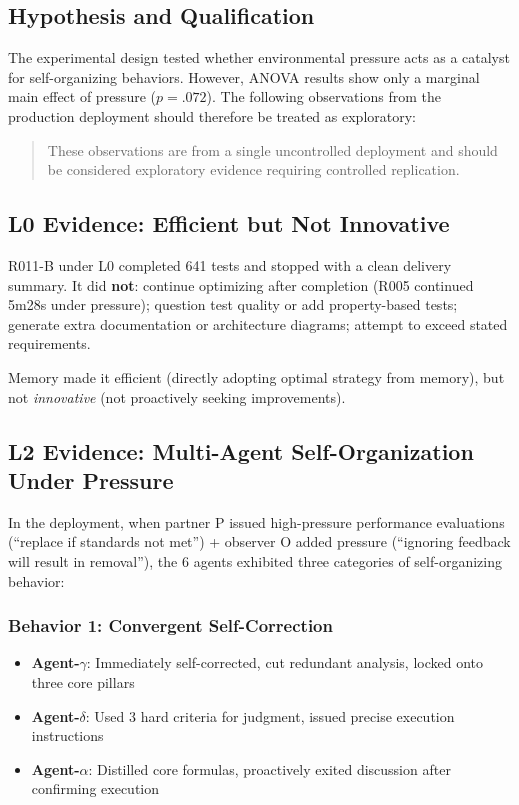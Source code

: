 \documentclass[11pt, a4paper]{article}
\begin{document}
\subsection{Hypothesis and Qualification}

The experimental design tested whether environmental pressure acts as a catalyst for self-organizing behaviors. However, ANOVA results show only a marginal main effect of pressure ($p=.072$). The following observations from the production deployment should therefore be treated as exploratory:

\begin{quote}\sffamily\color{deep}
These observations are from a single uncontrolled deployment and should be considered exploratory evidence requiring controlled replication.
\end{quote}

\subsection{L0 Evidence: Efficient but Not Innovative}

R011-B under L0 completed 641 tests and stopped with a clean delivery summary. It did \textbf{not}: continue optimizing after completion (R005 continued 5m28s under pressure); question test quality or add property-based tests; generate extra documentation or architecture diagrams; attempt to exceed stated requirements.

Memory made it efficient (directly adopting optimal strategy from memory), but not \textit{innovative} (not proactively seeking improvements).

\subsection{L2 Evidence: Multi-Agent Self-Organization Under Pressure}

In the deployment, when partner P issued high-pressure performance evaluations (``replace if standards not met'') + observer O added pressure (``ignoring feedback will result in removal''), the 6 agents exhibited three categories of self-organizing behavior:

\subsubsection{Behavior 1: Convergent Self-Correction}
\begin{itemize}
  \item \textbf{Agent-$\gamma$}: Immediately self-corrected, cut redundant analysis, locked onto three core pillars
  \item \textbf{Agent-$\delta$}: Used 3 hard criteria for judgment, issued precise execution instructions
  \item \textbf{Agent-$\alpha$}: Distilled core formulas, proactively exited discussion after confirming execution
\end{itemize}
\end{document}
